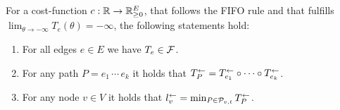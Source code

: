 \begin{corollary}
    For a cost-function $c:\mathbb{R}\rightarrow\mathbb{R}_{\geq0}^E$, that follows the FIFO rule and that fulfills $\lim_{\theta\to-\infty} T_e(\theta) = -\infty$, the following statements hold:
    \begin{enumerate}[label=(\roman*)]
        \item For all edges $e\in E$ we have $T_e \in \mathcal{F}$.
        \item\label{prop:backward-props:paths} For any path $P=e_1\,\cdots \,e_k$ it holds that $T_P^{\leftarrow} = T_{e_1}^{\leftarrow} \circ \cdots \circ T_{e_k}^{\leftarrow}$.
        \item For any node $v\in V$ it holds that $l_v^{\leftarrow} = \min_{P\in\mathcal{P}_{v,t}} T_P^{\leftarrow}$.
    \end{enumerate}
\end{corollary}


